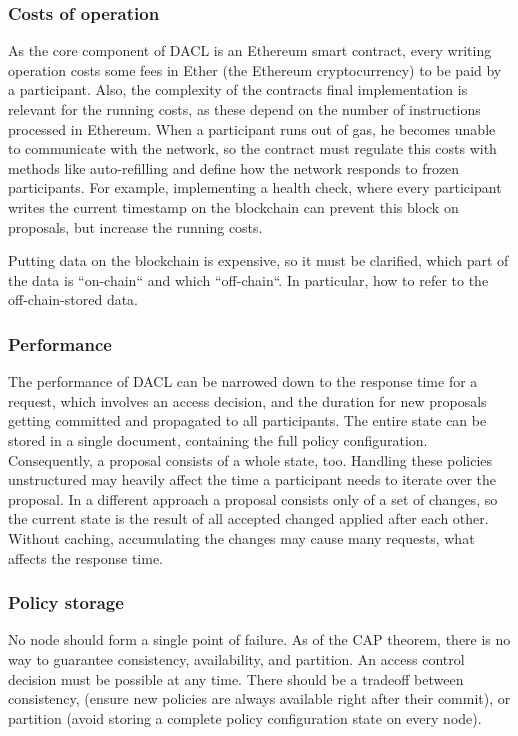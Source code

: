 \documentclass[12pt, conference]{IEEEtran}
\begin{document}
\subsubsection{Costs of operation}

As the core component of DACL is an Ethereum smart contract, every writing operation costs some fees in Ether (the Ethereum cryptocurrency) to be paid by a participant. Also, the complexity of the contracts final implementation is relevant for the running costs, as these depend on the number of instructions processed in Ethereum. When a participant runs out of gas, he becomes unable to communicate with the network, so the contract must regulate this costs with methods like auto-refilling and define how the network responds to frozen participants. For example, implementing a health check, where every participant writes the current timestamp on the blockchain can prevent this block on proposals, but increase the running costs.

Putting data on the blockchain is expensive, so it must be clarified, which part of the data is ``on-chain`` and which ``off-chain``. In particular, how to refer to the off-chain-stored data. 

\subsubsection{Performance}

The performance of DACL can be narrowed down to the response time for a request, which involves an access decision, and the duration for new proposals getting committed and propagated to all participants. The entire state can be stored in a single document, containing the full policy configuration. Consequently, a proposal consists of a whole state, too. Handling these policies unstructured may heavily affect the time a participant needs to iterate over the proposal. In a different approach a proposal consists only of a set of changes, so the current state is the result of all accepted changed applied after each other. Without caching, accumulating the changes may cause many requests, what affects the response time.

\subsubsection{Policy storage}

No node should form a single point of failure. As of the CAP theorem, there is no way to guarantee consistency, availability, and partition. An access control decision must be possible at any time. There should be a tradeoff between consistency, (ensure new policies are always available right after their commit), or partition (avoid storing a complete policy configuration state on every node).
\end{document}
